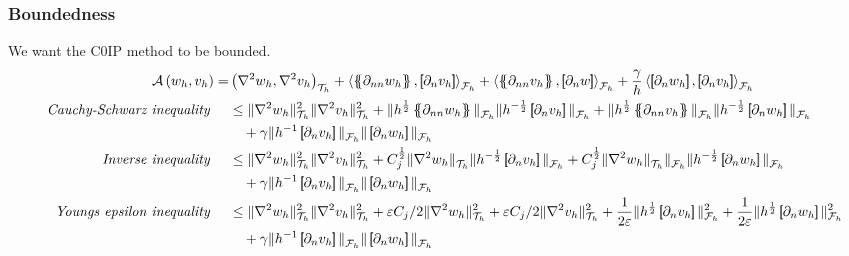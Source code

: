 \subsubsection{Boundedness}%
\label{ssub:bounded}
We want the C0IP method to be bounded.
\begin{equation*}
    \begin{split}
\mathcal{A} \left( w_{h}, v_{h} \right)   =&
    \left( \nabla ^2 w_{h}, \nabla ^2v_{h} \right) _{\mathcal{T} _{h}}
  +
  \left< \mean{  \partial _{n n} w_{h} }, \jump{ \partial _{n }v_{h}} \right>_{\mathcal{F}_{h}}  +
 \left< \mean{ \partial _{n n} v_{h} }, \jump{ \partial _{n}w }      \right>_{\mathcal{F}_{h}}
+ \frac{\gamma }{h}  \left< \jump{ \partial _{n} w_{h}}, \jump{ \partial _{n} v_{h}   }   \right>_{\mathcal{F}_{h}} \\
\quad \textit{Cauchy-Schwarz inequality }\quad  &\le
\| \nabla ^2w_{h} \|_{\mathcal{T} _{h}   }^{ 2 }  \| \nabla ^2v_{h} \|_{\mathcal{T} _{h}   }^{ 2 } + \| h^{\frac{1}{2}}\mean{ \partial _{nn} w_{h} } \|_{ \mathcal{F}_{h}  }^{  } \| h^{-\frac{1}{2}}\jump{ \partial _{n} v_{h} } \|_{ \mathcal{F}_{h}  }^{  }   + \| h^{\frac{1}{2}}\mean{ \partial _{nn} v_{h} }
\|_{ \mathcal{F}_{h}  }^{  } \| h^{-\frac{1}{2}}\jump{ \partial _{n} w_{h} } \|_{ \mathcal{F}_{h}  }^{  } \\
& \quad   + \gamma \| h^{-1} \jump{ \partial _{n} v_{h}}   \|_{ \mathcal{F} _{h} }^{  }   \|  \jump{ \partial _{n} w_{h}}   \|_{ \mathcal{F} _{h} }^{  } \\
\quad \textit{Inverse inequality }\quad  &\le
\| \nabla ^2w_{h} \|_{\mathcal{T} _{h}   }^{ 2 }  \| \nabla ^2v_{h} \|_{\mathcal{T} _{h}   }^{ 2 } + C_{j}^{\frac{1}{2}} \| \nabla ^2 w_{h} \|_{\mathcal{T} _{h}  }^{  }  \| h^{-\frac{1}{2}}\jump{ \partial _{n} v_{h} } \|_{ \mathcal{F}_{h}  }^{  }   +
C_{j}^{\frac{1}{2}} \| \nabla ^2 w_{h} \|_{\mathcal{T} _{h}  }^{  }
\|_{ \mathcal{F}_{h}  }^{  } \| h^{-\frac{1}{2}}\jump{ \partial _{n} w_{h} } \|_{ \mathcal{F}_{h}  }^{  } \\
& \quad   + \gamma \| h^{-1} \jump{ \partial _{n} v_{h}}   \|_{ \mathcal{F} _{h} }^{  }   \|  \jump{ \partial _{n} w_{h}}   \|_{ \mathcal{F} _{h} }^{  } \\
\quad \textit{Youngs epsilon inequality }\quad  &\le
\| \nabla ^2w_{h} \|_{\mathcal{T} _{h}   }^{ 2 }  \| \nabla ^2v_{h} \|_{\mathcal{T} _{h}   }^{ 2 } +  \varepsilon C_{j}/2 \| \nabla ^2 w_{h} \|_{ \mathcal{T} _{h} }^{2  }+
\varepsilon C_{j}/2 \| \nabla ^2 v_{h} \|_{ \mathcal{T} _{h} }^{2  } + \frac{1}{2\varepsilon } \| h^{\frac{1}{2}} \jump{ \partial _{n} v_{h} }   \|_{ \mathcal{F} _{h} }^{2  }    +
 \frac{1}{2\varepsilon } \| h^{\frac{1}{2}} \jump{ \partial _{n} w_{h} }   \|_{ \mathcal{F} _{h} }^{2  } \\
& \quad   + \gamma \| h^{-1} \jump{ \partial _{n} v_{h}}   \|_{ \mathcal{F} _{h} }^{  }   \|  \jump{ \partial _{n} w_{h}}   \|_{ \mathcal{F} _{h} }^{  }
\end{split}
\end{equation*}

